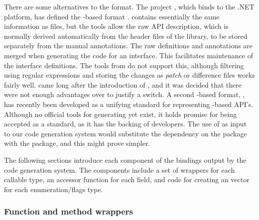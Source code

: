\documentclass[article,shortnames]{jss}
\begin{document}
There are some alternatives to the  format. The
project \citep{gtksharp}, which binds  to the .NET platform,
has defined the -based  format
\citep{GAPI}.
 contains essentially the same information as
files,
but the  tools allow the raw API description, which is
normally derived automatically from the header files of the library,
to be stored separately from the manual annotations. The raw
definitions and annotations are merged when generating the code for an
interface. This facilitates maintenance of the interface definitions.
The  tools from  do not support this,
although filtering using regular expressions and storing the changes
as \textsl{patch} or difference files works fairly well.
came long after the introduction of , and it was decided
that there were not enough advantages over  to justify
a
switch. A second -based format, 
\citep{gidl}, has
recently been developed as a unifying standard for representing
-based API's. Although no official tools for generating
 yet exist, it holds promise for being accepted as a
standard, as it has the backing of  developers. The use of
 as input to our code generation system would substitute
the
dependency on the  package with the  package,
and this might prove simpler.


The following sections introduce each component of the bindings output
by the code generation system. The components include a set of
wrappers for each callable type, an accessor function for each field,
and code for creating an  vector for each
enumeration/flags type.
 
\subsubsection{Function and method wrappers}
\end{document}
